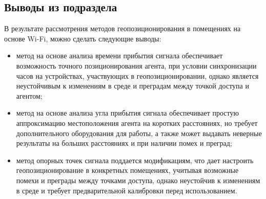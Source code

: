 \clearpage

\subsection*{Выводы из подраздела}

В результате рассмотрения методов геопозиционирования в помещениях на основе Wi-Fi, можно сделать следующие выводы:

\begin{itemize}[label=---]
    \item метод на основе анализа времени прибытия сигнала обеспечивает возможность точного позиционирования агента, при условии синхронизации часов на устройствах, участвующих в геопозиционировании, однако является неустойчивым к изменениям в среде и преградам между точкой доступа и агентом;
    \item метод на основе анализа угла прибытия сигнала обеспечивает простую аппроксимацию местоположения агента на коротких расстояниях, но требует дополнительного оборудования для работы, а также может выдавать неверные результаты на больших расстояниях и при наличии помех и преград;
    \item метод опорных точек сигнала поддается модификациям, что дает настроить геопозиционирование в конкретных помещениях, учитывая возможные помехи и преграды между точками доступа, однако неустойчив к изменениям в среде и требует предварительной калибровки перед использованием. 
\end{itemize}

\clearpage




